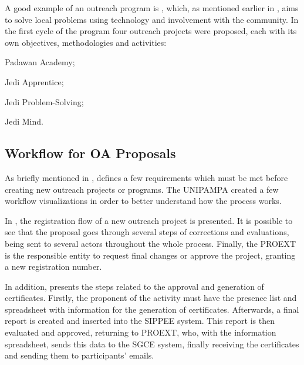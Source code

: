 A good example of an outreach program is , which, as mentioned earlier in , aims to solve local problems using technology and involvement with the community. In the first cycle of the program four outreach projects were proposed, each with its own objectives, methodologies and activities:
\begin{inparaenum}[(i)]
  \item Padawan Academy;
  \item Jedi Apprentice;
  \item Jedi Problem-Solving;
  \item Jedi Mind.
\end{inparaenum}

\subsection{Workflow for \acl{OA} Proposals}\label{sec:bac-proposals}

As briefly mentioned in ,  defines a few requirements which must be met before creating new outreach projects or programs. The \acl{UNIPAMPA} created a few workflow visualizations in order to better understand how the process works.


In , the registration flow of a new outreach project is presented. It is possible to see that the proposal goes through several steps of corrections and evaluations, being sent to several actors throughout the whole process. Finally, the \acl{PROEXT} is the responsible entity to request final changes or approve the project, granting a new registration number.


In addition,  presents the steps related to the approval and generation of certificates. Firstly, the proponent of the activity must have the presence list and spreadsheet with information for the generation of certificates. Afterwards, a final report is created and inserted into the \ac{SIPPEE} system. This report is then evaluated and approved, returning to \ac{PROEXT}, who, with the information spreadsheet, sends this data to the \ac{SGCE} system, finally receiving the certificates and sending them to participants' emails.


